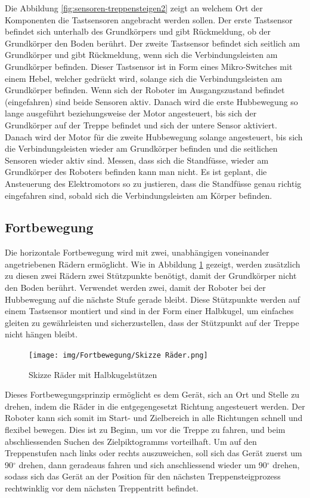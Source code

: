 Die Abbildung \ref{fig:sensoren-treppensteigen2} zeigt an welchem Ort der Komponenten die Tastsensoren angebracht werden sollen. Der erste Tastsensor befindet sich unterhalb des Grundkörpers und gibt Rückmeldung, ob der Grundkörper den Boden berührt. Der zweite Tastsensor befindet sich seitlich am Grundkörper und gibt Rückmeldung, wenn sich die Verbindungsleisten am Grundkörper befinden. Dieser Tastsensor ist in Form eines Mikro-Switches mit einem Hebel, welcher gedrückt wird, solange sich die Verbindungsleisten am Grundkörper befinden. Wenn sich der Roboter im Ausgangszustand befindet (eingefahren) sind beide Sensoren aktiv. Danach wird die erste Hubbewegung so lange ausgeführt beziehungsweise der Motor angesteuert, bis sich der Grundkörper auf der Treppe befindet und sich der untere Sensor aktiviert. Danach wird der Motor für die zweite  Hubbewegung solange angesteuert, bis sich die Verbindungsleisten wieder am Grundkörper befinden und die seitlichen Sensoren wieder aktiv sind. Messen, dass sich die Standfüsse, wieder am Grundkörper des Roboters befinden kann man nicht. Es ist geplant, die Ansteuerung des Elektromotors so zu justieren, dass die Standfüsse genau richtig eingefahren sind, sobald sich die Verbindungsleisten am Körper befinden.


\newpage
\subsection{Fortbewegung}
\label{sec:fortbewegung}
Die horizontale Fortbewegung wird mit zwei, unabhängigen voneinander angetriebenen Rädern ermöglicht. Wie in Abbildung \ref{fig:skizze-raeder} gezeigt, werden zusätzlich zu diesen zwei Rädern zwei Stützpunkte benötigt, damit der Grundkörper nicht den Boden berührt. Verwendet werden zwei, damit der Roboter bei der Hubbewegung auf die nächste Stufe gerade bleibt. Diese Stützpunkte werden auf einem Tastsensor montiert und sind in der Form einer Halbkugel, um einfaches gleiten zu gewährleisten und sicherzustellen, dass der Stützpunkt auf der Treppe nicht hängen bleibt.

\begin{figure}[H]
  \texttt{[image: img/Fortbewegung/Skizze Räder.png]}
  \centering
  \caption{Skizze Räder mit Halbkugelstützen}
  \label{fig:skizze-raeder}
\end{figure}

Dieses Fortbewegungsprinzip ermöglicht es dem Gerät, sich an Ort und Stelle zu drehen, indem die Räder in die entgegengesetzt Richtung angesteuert werden. Der Roboter kann sich somit im Start- und Zielbereich in alle Richtungen schnell und flexibel bewegen. Dies ist zu Beginn, um vor die Treppe zu fahren, und beim abschliessenden Suchen des Zielpiktogramms vorteilhaft. Um auf den Treppenstufen nach links oder rechts auszuweichen, soll sich das Gerät zuerst um 90$^\circ$ drehen, dann geradeaus fahren und sich anschliessend wieder um 90$^\circ$ drehen, sodass sich das Gerät an der Position für den nächsten Treppensteigprozess rechtwinklig vor dem nächsten Treppentritt befindet.

